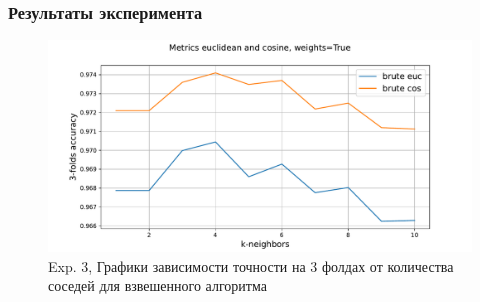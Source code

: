 \documentclass[10pt]{article}
\begin{document}
\begin{itemize}
		    \subsubsection*{Результаты эксперимента}
		    {
		    	\begin{figure}[h]
		    		\begin{minipage}[h]{0.51\linewidth}
		    		\end{minipage}
		    		\hfill
		    		\begin{minipage}[h]{0.51\linewidth}
		    		\end{minipage}
		    		\vfill
		    		\begin{minipage}[h]{0.51\linewidth}
		    			\begin{center}
		    				\includegraphics[width=1.0\linewidth]{experiment3_chart3.pdf}
		    			\end{center}
		    		\end{minipage}
		    		\caption{Exp. 3, Графики зависимости точности на 3 фолдах от количества соседей для взвешенного алгоритма}
		    		\label{ris:image3}
		    	\end{figure}
		    }
		    

\end{itemize}
\end{document}
